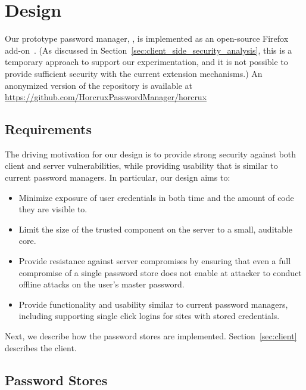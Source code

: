 \section{Design} \label{horcrux}

Our prototype password manager, \SecPass, is implemented as an open-source Firefox add-on~\cite{firefox_addon}.  (As discussed in Section~\ref{sec:client_side_security_analysis}, this is a temporary approach to support our experimentation, and it is not possible to provide sufficient security with the current extension mechanisms.)
An anonymized version of the repository is available at {\url{https://github.com/HorcruxPasswordManager/horcrux}} %


\subsection{Requirements}

The driving motivation for our design is to provide strong security against both client and server vulnerabilities, while providing usability that is similar to current password managers.  In particular, our design aims to:
\begin{itemize}
\item Minimize exposure of user credentials in both time and the amount of code they are visible to.
\item Limit the size of the trusted component on the server to a small, auditable core.
\item Provide resistance against server compromises by ensuring that even a full compromise of a single password store does not enable at attacker to conduct offline attacks on the user's master password.
\item Provide functionality and usability similar to current password managers, including supporting single click logins for sites with stored credentials. 
\end{itemize}
Next, we describe how the password stores are implemented. Section~\ref{sec:client} describes the client.

\subsection{Password Stores}
\label{sec:password_stores}


